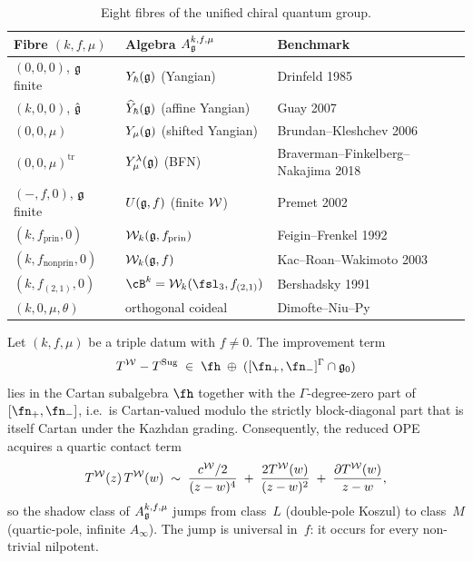 \begin{table}[ht]
\centering
\small
\caption{Eight fibres of the unified chiral quantum group.}
\label{tab:eight-fibres}
\begin{tabular}{lll}
\toprule
Fibre $(k,f,\mu)$ & Algebra $A_{\mathfrak{g}}^{k,f,\mu}$ & Benchmark \\
\midrule
$(0,0,0)$, $\mathfrak{g}$ finite & $Y_\hbar(\mathfrak{g})$ (Yangian) & Drinfeld 1985 \\
$(k,0,0)$, $\hat{\mathfrak{g}}$ & $\widehat{Y}_\hbar(\mathfrak{g})$ (affine Yangian) & Guay 2007 \\
$(0,0,\mu)$ & $Y_\mu(\mathfrak{g})$ (shifted Yangian) & Brundan--Kleshchev 2006 \\
$(0,0,\mu)^{\mathrm{tr}}$ & $Y_\mu^\lambda(\mathfrak{g})$ (BFN) & Braverman--Finkelberg--Nakajima 2018 \\
$(-,f,0)$, $\mathfrak{g}$ finite & $U(\mathfrak{g},f)$ (finite $\mathcal{W}$) & Premet 2002 \\
$(k,f_{\mathrm{prin}},0)$ & $\mathcal{W}_k(\mathfrak{g},f_{\mathrm{prin}})$ & Feigin--Frenkel 1992 \\
$(k,f_{\mathrm{nonprin}},0)$ & $\mathcal{W}_k(\mathfrak{g},f)$ & Kac--Roan--Wakimoto 2003 \\
$(k,f_{(2,1)},0)$ & $\cB^k = \cW_k(\fsl_3,f_{(2,1)})$ & Bershadsky 1991 \\
$(k,0,\mu,\theta)$ & orthogonal coideal & Dimofte--Niu--Py \cite{DNP25} \\
\bottomrule
\end{tabular}
\end{table}

\begin{theorem}
\label{thm:ds-l-to-m-universal}
Let $(k,f,\mu)$ be a triple datum with $f\ne 0$. The improvement
term
\begin{equation}\label{eq:Timp-cartan}
T^\cW - T^{\mathrm{Sug}}
\;\in\;
\fh\;\oplus\;([\fn_+,\fn_-]^{\Gamma}\cap \fg_0)
\end{equation}
lies in the Cartan subalgebra $\fh$ together with the $\Gamma$-degree-zero
part of $[\fn_+,\fn_-]$, i.e.\ is Cartan-valued modulo the strictly
block-diagonal part that is itself Cartan under the Kazhdan grading.
Consequently, the reduced OPE acquires a quartic contact term
\begin{equation}\label{eq:tw-quartic}
T^{\mathcal{W}}(z)\,T^{\mathcal{W}}(w)
\;\sim\;
\frac{c^{\mathcal{W}}/2}{(z-w)^4}
\;+\;\frac{2T^{\mathcal{W}}(w)}{(z-w)^2}
\;+\;\frac{\partial T^{\mathcal{W}}(w)}{z-w},
\end{equation}
so the shadow class of $A_{\mathfrak{g}}^{k,f,\mu}$ jumps from class~$L$
\textup{(}double-pole Koszul\textup{)} to class~$M$
\textup{(}quartic-pole, infinite $A_\infty$\textup{)}. The jump is
universal in~$f$: it occurs for every non-trivial nilpotent.
\end{theorem}

